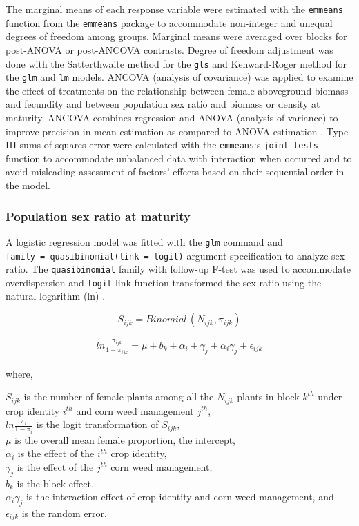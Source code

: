 \documentclass[utf8]{frontiersSCNS}
\begin{document}
The marginal means of each response variable were estimated with the \texttt{emmeans} function from the \texttt{emmeans} package \citep[version 1.7.1-1,][]{lenthEmmeansEstimatedMarginal2021} to accommodate non-integer and unequal degrees of freedom among groups. Marginal means were averaged over blocks for post-ANOVA or post-ANCOVA contrasts. Degree of freedom adjustment was done with the Satterthwaite method for the \texttt{gls} and Kenward-Roger method for the \texttt{glm} and \texttt{lm} models. ANCOVA (analysis of covariance) was applied to examine the effect of treatments on the relationship between female aboveground biomass and fecundity and between population sex ratio and biomass or density at maturity.
ANCOVA combines regression and ANOVA (analysis of variance) to improve precision in mean estimation as compared to ANOVA estimation \citep{yangAnalysisCovarianceAgronomy2011}. Type III sums of squares error were calculated with the \texttt{emmeans}`s \texttt{joint\_tests} function to accommodate unbalanced data with interaction when occurred and to avoid misleading assessment of factors' effects based on their sequential order in the model.

\hypertarget{population-sex-ratio-at-maturity}{%
\subsubsection*{Population sex ratio at maturity}\label{population-sex-ratio-at-maturity}}

A logistic regression model was fitted with the \texttt{glm} command and \texttt{family\ =\ quasibinomial(link\ =\ logit)} argument specification to analyze sex ratio. The \texttt{quasibinomial} family with follow-up F-test was used to accommodate overdispersion and \texttt{logit} link function transformed the sex ratio using the natural logarithm (ln) \citep{crawleyProportionData2013}.

\[ S_{ijk} = Binomial\,(N_{ijk},\pi_{ijk}) \]

\begin{align}
ln \frac{\pi_{ijk}}{1-\pi_{ijk}} = \mu + b_k + \alpha_i + \gamma_j +\alpha_i \gamma_j + \epsilon_{ijk} \label{eq:sex-mature}
\end{align}

where,

\(S_{ijk}\) is the number of female plants among all the \(N_{ijk}\) plants in block \(k^{th}\) under crop identity \(i^{th}\) and corn weed management \(j^{th}\),\\
\(ln \frac{\pi_i}{1-\pi_i}\) is the logit transformation of \(S_{ijk}\),\\
\(\mu\) is the overall mean female proportion, the intercept,\\
\(\alpha_i\) is the effect of the \(i^{th}\) crop identity,\\
\(\gamma_j\) is the effect of the \(j^{th}\) corn weed management,\\
\(b_k\) is the block effect,\\
\(\alpha_i \gamma_j\) is the interaction effect of crop identity and corn weed management, and\\
\(\epsilon_{ijk}\) is the random error.
\end{document}
